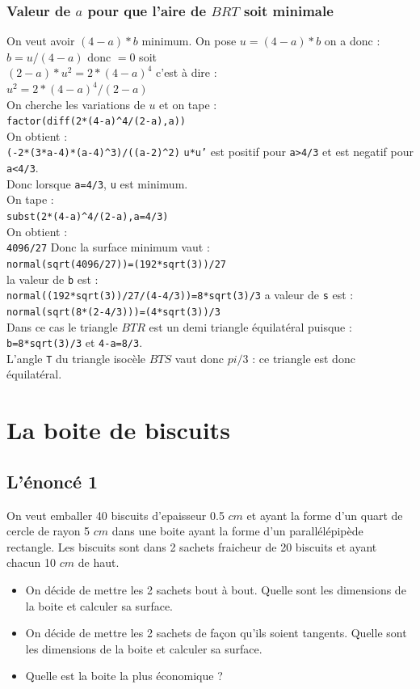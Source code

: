 \documentclass[a4paper,11pt]{book}
\begin{document}
\subsubsection{Valeur de $a$ pour que l'aire de $BRT$ soit minimale}
On veut avoir $(4-a)*b$ minimum. On pose $u=(4-a)*b$ on a donc :\\
$b=u/(4-a)$ donc $=0$ soit \\
$(2-a)*u^2=2*(4-a)^4$ c'est \`a dire :\\
$u^2=2*(4-a)^4/(2-a)$\\
On cherche les variations de $u$ et on tape :\\
{\tt factor(diff(2*(4-a)\verb|^|4/(2-a),a))}\\
On obtient :\\
{\tt (-2*(3*a-4)*(a-4)\verb|^|3)/((a-2)\verb|^|2)}
{\tt u*u'} est positif  pour {\tt a>4/3} et est negatif pour {\tt a<4/3}.\\
Donc lorsque {\tt a=4/3}, {\tt u} est minimum. \\
On tape :\\ 
{\tt subst(2*(4-a)\verb|^|4/(2-a),a=4/3)}\\
On obtient :\\
{\tt 4096/27}
Donc la surface minimum vaut :\\
{\tt normal(sqrt(4096/27))=(192*sqrt(3))/27} \\
la valeur de {\tt b} est :\\
{\tt normal((192*sqrt(3))/27/(4-4/3))=8*sqrt(3)/3}
a valeur de {\tt s} est :\\
{\tt normal(sqrt(8*(2-4/3)))=(4*sqrt(3))/3}\\
Dans ce cas le triangle $BTR$ est un demi triangle \'equilat\'eral puisque :\\
{\tt b=8*sqrt(3)/3} et {\tt 4-a=8/3}.\\
L'angle {\tt T} du triangle isoc\`ele $BTS$ vaut donc $pi/3$ : ce triangle est 
donc \'equilat\'eral. 
\section{La boite de biscuits}
\subsection{L'\'enonc\'e 1}
On veut emballer 40 biscuits d'epaisseur 0.5 $cm$ et ayant la forme d'un quart 
de cercle de rayon 5 $cm$ dans une boite ayant la forme d'un 
parall\'el\'epip\`ede rectangle. Les biscuits sont dans 2 sachets fraicheur de 
20 biscuits et ayant chacun 10 $cm$ de haut.
\begin{itemize}
\item On d\'ecide  de mettre les 2 
sachets bout \`a bout. Quelle sont les dimensions de la boite et calculer sa surface.
\item On d\'ecide de mettre les 2 sachets de fa\c{c}on qu'ils soient tangents.
Quelle sont les dimensions de la boite et calculer sa surface.
\item Quelle est la boite la plus \'economique ?
\end{itemize}
\end{document}
